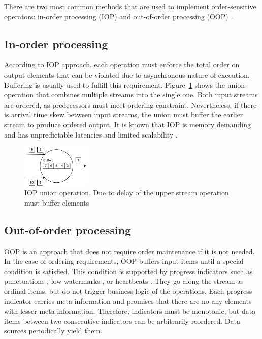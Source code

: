 
\label {fs-typical}

There are two most common methods that are used to implement order-sensitive operators: in-order processing (IOP) \cite{Arasu:2006:CCQ:1146461.1146463, Cranor:2003:GSD:872757.872838, hammad2004optimizing} and out-of-order processing (OOP) \cite{Li:2008:OPN:1453856.1453890}.

\subsection{In-order processing}
According to IOP approach, each operation must enforce the total order on output elements that can be violated due to asynchronous nature of execution. Buffering is usually used to fulfill this requirement. Figure~\ref{iop} shows the union operation that combines multiple streams into the single one. Both input streams are ordered, as predecessors must meet ordering constraint. Nevertheless, if there is arrival time skew between input streams, the union must buffer the earlier stream to produce ordered output. It is known that IOP is memory demanding and has unpredictable latencies and limited scalability \cite{Li:2008:OPN:1453856.1453890}.

\begin{figure}[htbp]
  \centering
  \includegraphics[width=0.30\textwidth]{pics/iop}
  \caption{IOP union operation. Due to delay of the upper stream operation must buffer elements}
  \label {iop}
\end{figure}

\subsection{Out-of-order processing}
OOP is an approach that does not require order maintenance if it is not needed. In the case of ordering requirements, OOP buffers input items until a special condition is satisfied. This condition is supported by progress indicators such as punctuations \cite{Tucker:2003:EPS:776752.776780}, low watermarks \cite{Akidau:2013:MFS:2536222.2536229}, or heartbeats \cite{Srivastava:2004:FTM:1055558.1055596}. They go along the stream as ordinal items, but do not trigger business-logic of the operations. Each progress indicator carries meta-information and promises that there are no any elements with lesser meta-information. Therefore, indicators must be monotonic, but data items between two consecutive indicators can be arbitrarily reordered. Data sources periodically yield them.

